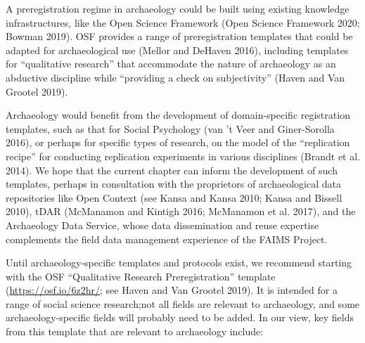 \documentclass[article]{sa}
\begin{document}
A preregistration regime in archaeology could be built using existing
knowledge infrastructures, like the Open Science Framework (Open Science
Framework 2020; Bowman 2019). OSF provides a range of preregistration
templates that could be adapted for archaeological use (Mellor and
DeHaven 2016), including templates for ``qualitative research'' that
accommodate the nature of archaeology as an abductive discipline while
``providing a check on subjectivity'' (Haven and Van Grootel 2019).

Archaeology would benefit from the development of domain-specific
registration templates, such as that for Social Psychology (van 't Veer
and Giner-Sorolla 2016), or perhaps for specific types of research, on
the model of the ``replication recipe'' for conducting replication
experiments in various disciplines (Brandt et al. 2014). We hope that
the current chapter can inform the development of such templates,
perhaps in consultation with the proprietors of archaeological data
repositories like Open Context (see Kansa and Kansa 2010; Kansa and
Bissell 2010), tDAR (McManamon and Kintigh 2016; McManamon et al. 2017),
and the Archaeology Data Service, whose data dissemination and reuse
expertise complements the field data management experience of the FAIMS
Project.

Until archaeology-specific templates and protocols exist, we recommend
starting with the OSF ``Qualitative Research Preregistration'' template
(\href{https://osf.io/6z2hr/}{{https://osf.io/6z2hr/}}; see Haven and
Van Grootel 2019). It is intended for a range of social science
research;not all fields are relevant to archaeology, and some
archaeology-specific fields will probably need to be added. In our view,
key fields from this template that are relevant to archaeology include:
\end{document}
